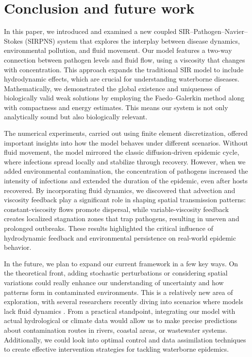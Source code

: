 \documentclass[10pt,number,preprint,times]{elsarticle}
\numberwithin{equation}{section} %
\begin{document}
	\section{Conclusion and future work}\label{conclusion}
In this paper, we introduced and examined a new coupled SIR–Pathogen–Navier–Stokes (SIRPNS) system that explores the interplay between disease dynamics, environmental pollution, and fluid movement. Our model features a two-way connection between pathogen levels and fluid flow, using a viscosity that changes with concentration. This approach expands the traditional SIR model to include hydrodynamic effects, which are crucial for understanding waterborne diseases. Mathematically, we demonstrated the global existence and uniqueness of biologically valid weak solutions by employing the Faedo–Galerkin method along with compactness and energy estimates. This means our system is not only analytically sound but also biologically relevant.

The numerical experiments, carried out using finite element discretization, offered important insights into how the model behaves under different scenarios. Without fluid movement, the model mirrored the classic diffusion-driven epidemic cycle, where infections spread locally and stabilize through recovery. However, when we added environmental contamination, the concentration of pathogens increased the intensity of infections and extended the duration of the epidemic, even after hosts recovered. By incorporating fluid dynamics, we discovered that advection and viscosity feedback play a significant role in shaping spatial transmission patterns: constant-viscosity flows promote dispersal, while variable-viscosity feedback creates localized stagnation zones that trap pathogens, resulting in uneven and prolonged outbreaks. These results highlighted the critical influence of hydrodynamic feedback and environmental persistence on real-world epidemic behavior.
	

In the future, we plan to expand our current framework in a few key ways. On the theoretical front, adding stochastic perturbations or considering spatial variations could really enhance our understanding of uncertainty and how patterns form in contaminated environments. This is a relatively new area of exploration, with several researchers recently diving into scenarios where models lack fluid dynamics \cite{mehdaoui2024well,bendahmane2025global}. From a practical standpoint, integrating our model with actual hydrological or climate data would allow us to make precise predictions about contamination routes in rivers, coastal areas, or wastewater systems. Additionally, we could look into optimal control and data assimilation techniques to create effective intervention strategies for tackling waterborne epidemics.
\end{document}
